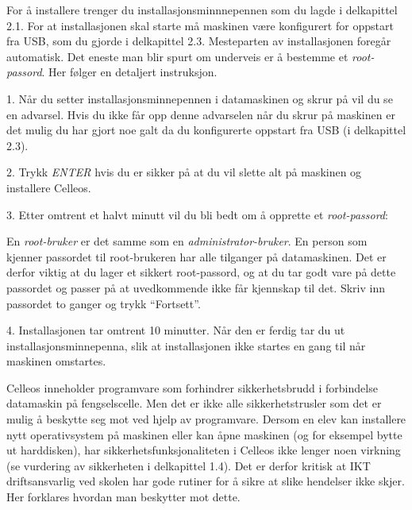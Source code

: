 For \aa{} installere trenger du installasjons\-minnnepennen som du lagde i delkapittel 2.1. For at installasjonen skal starte m\aa{} maskinen v\ae re konfigurert for oppstart fra USB, som du gjorde i delkapittel 2.3. Mesteparten av installasjonen foreg\aa r automatisk. Det eneste man blir spurt om underveis er \aa{} bestemme et {\it root-passord}. Her f\o lger en detaljert instruksjon.
\item{1.} N\aa r du setter installasjonsminnepennen i datamaskinen og skrur p\aa{} vil du se en advarsel. Hvis du ikke f\aa r opp denne advarselen n\aa r du skrur p\aa{} maskinen er det mulig du har gjort noe galt da du konfigurerte oppstart fra USB (i delkapittel 2.3).
\vskip 1pc
\vskip 1pc
\item{2.} Trykk {\it ENTER} hvis du er sikker p\aa{} at du vil slette alt p\aa{} maskinen og installere Celleos.
\item{3.} Etter omtrent et halvt minutt vil du bli bedt om \aa{} opprette et {\it root-passord}:
\vskip 1pc
\vskip 1pc
\item{} En {\it root-bruker} er det samme som en {\it administrator-bruker}. En person som kjenner passordet til root-brukeren har alle tilganger p\aa{} datamaskinen. Det er derfor viktig at du lager et sikkert root-passord, og at du tar godt vare p\aa{} dette passordet og passer p\aa{} at uvedkommende ikke f\aa r kjennskap til det. Skriv inn passordet to ganger og trykk ``Fortsett''.
\item{4.} Installasjonen tar omtrent 10 minutter. N\aa r den er ferdig tar du ut installasjonsminnepenna, slik at installasjonen ikke startes en gang til n\aa r maskinen omstartes.

\vfill\eject
\topglue 1pc

Celleos inneholder programvare som forhindrer sikkerhetsbrudd i forbindelse datamaskin p\aa{} fengselscelle. Men det er ikke alle sikkerhetstrusler som det er mulig \aa{} beskytte seg mot ved hjelp av programvare. Dersom en elev kan installere nytt operativsystem p\aa{} maskinen eller kan \aa pne maskinen (og for eksempel bytte ut harddisken), har sikkerhetsfunksjonaliteten i Celleos ikke lenger noen virkning (se vurdering av sikkerheten i delkapittel 1.4). Det er derfor kritisk at IKT driftsansvarlig ved skolen har gode rutiner for \aa{} sikre at slike hendelser ikke skjer. Her forklares hvordan man beskytter mot dette.

